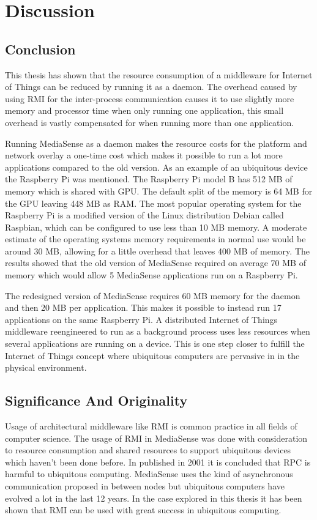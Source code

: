 \chapter{Discussion}

\section{Conclusion}
This thesis has shown that the resource consumption of a middleware for Internet of Things can be reduced by running it as a daemon. The overhead caused by using RMI for the inter-process communication causes it to use slightly more memory and processor time when only running one application, this small overhead is vastly compensated for when running more than one application. 

Running MediaSense as a daemon makes the resource costs for the platform and network overlay a one-time cost which makes it possible to run a lot more applications compared to the old version. As an example of an ubiquitous device the Raspberry Pi \cite{rpiweb} was mentioned. The Raspberry Pi model B has 512 MB of memory which is shared with GPU. The default split of the memory is 64 MB for the GPU leaving 448 MB as RAM. The most popular operating system for the Raspberry Pi is a modified version of the Linux distribution Debian called Raspbian, which can be configured to use less than 10 MB memory. A moderate estimate of the operating systems memory requirements in normal use would be around 30 MB, allowing for a little overhead that leaves 400 MB of memory. The results showed that the old version of MediaSense required on average 70 MB of memory which would allow 5 MediaSense applications run on a Raspberry Pi.

The redesigned version of MediaSense requires 60 MB memory for the daemon and then 20 MB per application. This makes it possible to instead run 17 applications on the same Raspberry Pi.
A distributed Internet of Things middleware reengineered to run as a background process uses less resources when several applications are running on a device. This is one step closer to fulfill the Internet of Things concept where ubiquitous computers are pervasive in in the physical environment.

\section{Significance And Originality}
Usage of architectural middleware like RMI is common practice in all fields of computer science. The usage of RMI in MediaSense was done with consideration to resource consumption and shared resources to support ubiquitous devices which haven't been done before. In \cite{ubiqrpc} published in 2001 it is concluded that RPC is harmful to ubiquitous computing. MediaSense uses the kind of asynchronous communication proposed in \cite{ubiqrpc} between nodes but ubiquitous computers have evolved a lot in the last 12 years. In the case explored in this thesis it has been shown that RMI can be used with great success in ubiquitous computing.

